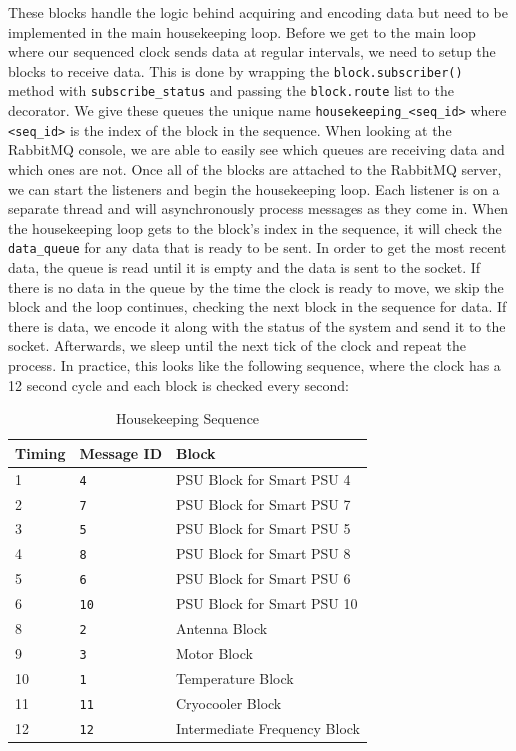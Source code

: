 These blocks handle the logic behind acquiring and encoding data but need to be implemented in the main housekeeping loop.
Before we get to the main loop where our sequenced clock sends data at regular intervals, we need to setup the blocks to receive data. 
This is done by wrapping the \texttt{block.subscriber()} method with \texttt{subscribe\_status} and passing the \texttt{block.route} list to the decorator.
We give these queues the unique name \texttt{housekeeping\_<seq\_id>} where \texttt{<seq\_id>} is the index of the block in the sequence.
When looking at the RabbitMQ console, we are able to easily see which queues are receiving data and which ones are not.
Once all of the blocks are attached to the RabbitMQ server, we can start the listeners and begin the housekeeping loop.
Each listener is on a separate thread and will asynchronously process messages as they come in.
When the housekeeping loop gets to the block's index in the sequence, it will check the \texttt{data\_queue} for any data that is ready to be sent.
In order to get the most recent data, the queue is read until it is empty and the data is sent to the socket.
If there is no data in the queue by the time the clock is ready to move, we skip the block and the loop continues, checking the next block in the sequence for data. 
If there is data, we encode it along with the status of the system and send it to the socket.
Afterwards, we sleep until the next tick of the clock and repeat the process.
In practice, this looks like the following sequence, where the clock has a 12 second cycle and each block is checked every second:
\begin{table}
    \centering
    \begin{tabularx}{\textwidth}{l|l|X}
        \textbf{Timing} & \textbf{Message ID} & \textbf{Block} \\
        \hline
        1 &\texttt{4} & PSU Block for Smart PSU 4 \\
        2 &\texttt{7} & PSU Block for Smart PSU 7 \\
        3 &\texttt{5} & PSU Block for Smart PSU 5 \\
        4 &\texttt{8} & PSU Block for Smart PSU 8 \\
        5 &\texttt{6} & PSU Block for Smart PSU 6 \\
        6 &\texttt{10} & PSU Block for Smart PSU 10 \\
        8 &\texttt{2} & Antenna Block \\
        9 & \texttt{3} & Motor Block \\
        10 & \texttt{1} & Temperature Block \\
        11 & \texttt{11} & Cryocooler Block \\
        12 & \texttt{12} & Intermediate Frequency Block \\
    \end{tabularx}
    \label{readout/table:housekeeping_sequence}
    \caption{Housekeeping Sequence}
\end{table}

